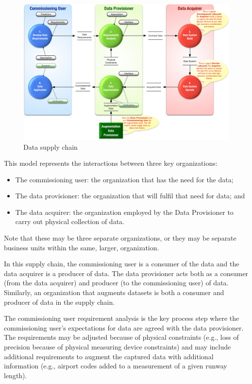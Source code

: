 \begin{figure}[htbp]
  \centering
  \includegraphics[width=\textwidth]{images/dataacquisitionlifecycleflat}
  \caption{Data supply chain}
  \label{fig:dataacquisitionlifecycle}
\end{figure}

This model represents the interactions between three key organizations:
\begin{itemize}
  \item The commissioning user: the organization that has the need for the data;
  \item The data provisioner: the organization that will fulfil that need for data; and
  \item The data acquirer: the organization employed by the Data Provisioner to carry out physical collection of data.
\end{itemize}

Note that these may be three separate organizations, or they may be separate business units within the same, larger, organization.

In this supply chain, the commissioning user is a consumer of the data and the data acquirer is a producer of data. The data provisioner acts both as a consumer (from the data acquirer) and producer (to the commissioning user) of data. Similarly, an organization that augments \glspl{dataset} is both a consumer and producer of data in the supply chain.

The commissioning user requirement analysis is the key process step where the commissioning user's expectations for data are agreed with the data provisioner. The requirements may be adjusted because of physical constraints (e.g., loss of precision because of physical measuring device constraints) and may include additional requirements to augment the captured data with additional \gls{information} (e.g., airport codes added to a measurement of a given runway length).

